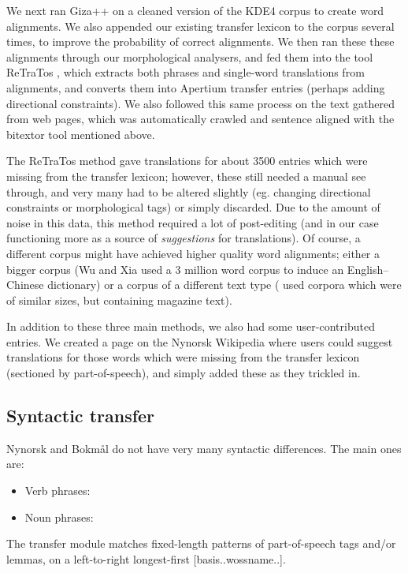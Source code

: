\documentclass[11pt]{article}
\begin{document}
We next ran Giza++ \citep{och2003scv} on a cleaned version of the KDE4
corpus to create word alignments. We also appended our existing
transfer lexicon to the corpus several times, to improve the
probability of correct alignments. We then ran these these alignments
through our morphological analysers, and fed them into the tool
ReTraTos \citep{caseli2006aib}, which extracts both phrases and
single-word translations from alignments, and converts them into
Apertium transfer entries (perhaps adding directional constraints). We
also followed this same process on the text gathered from web pages,
which was automatically crawled and sentence aligned with the bitextor
tool mentioned above.

The ReTraTos method gave translations for about 3500 entries which
were missing from the transfer lexicon; however, these still needed a
manual see through, and very many had to be altered slightly (eg.
changing directional constraints or morphological tags) or simply
discarded. Due to the amount of noise in this data, this method
required a lot of post-editing (and in our case functioning more as a
source of \emph{suggestions} for translations). Of course, a different
corpus might have achieved higher quality word alignments; either a
bigger corpus (Wu and Xia \citep[1994, in][p.~230]{caseli2006aib} used
a 3 million word corpus to induce an English–Chinese dictionary) or a
corpus of a different text type (\citet{caseli2006aib} used corpora
which were of similar sizes, but containing magazine text).

In addition to these three main methods, we also had some
user-contributed entries. We created a page on the Nynorsk Wikipedia
where users could suggest translations for those words which were
missing from the transfer lexicon (sectioned by part-of-speech), and
simply added these as they trickled in.


\subsection{Syntactic transfer}

Nynorsk and Bokmål do not have very many syntactic differences. The main ones are:
\begin{itemize}
\item Verb phrases:
\item Noun phrases:
\end{itemize}

The transfer module matches fixed-length patterns of part-of-speech
tags and/or lemmas, on a left-to-right longest-first
[basis..wossname..]. 
\end{document}
